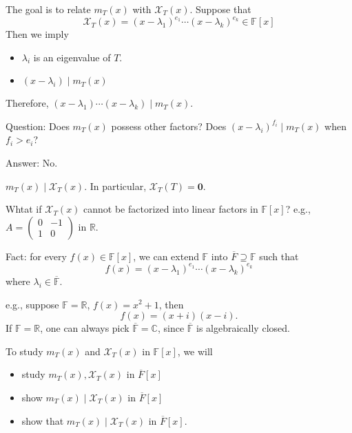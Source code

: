The goal is to relate $m_T(x)$ with $\mathcal{X}_T(x)$.
Suppose that
\[
\mathcal{X}_T(x) = (x-\lambda_1)^{e_1}\cdots(x-\lambda_k)^{e_k}\in\mathbb{F}[x]
\]
Then we imply
\begin{itemize}
\item
$\lambda_i$ is an eigenvalue of $T$.
\item
$(x-\lambda_i)\mid m_T(x)$
\end{itemize}
Therefore, $(x-\lambda_1)\cdots(x-\lambda_k)\mid m_T(x)$.

Question: Does $m_T(x)$ possess other factors?
Does $(x-\lambda_i)^{f_i}\mid m_T(x)$ when $f_i>e_i$?

Answer: No.

\begin{theorem}
$m_T(x)\mid\mathcal{X}_T(x)$. In particular, $\mathcal{X}_T(T)=\bm0$.
\end{theorem}
Whtat if $\mathcal{X}_{T}(x)$ cannot be factorized into linear factors in $\mathbb{F}[x]$? e.g., $A=\begin{pmatrix}
0&-1\\1&0
\end{pmatrix}$ in $\mathbb{R}$.

Fact: for every $f(x)\in\mathbb{F}[x]$, we can extend $\mathbb{F}$ into $\overline{F}\supseteq\mathbb{F}$ such that
\[
f(x) = (x-\lambda_1)^{e_1}\cdots(x-\lambda_k)^{e_k}
\]
where $\lambda_i\in\overline{\mathbb{F}}$.

e.g., suppose $\mathbb{F}=\mathbb{R}$, $f(x) = x^2+1$, then
\[
f(x) = (x+i)(x-i).
\]
If $\mathbb{F}= \mathbb{R}$, one can always pick $\overline{\mathbb{F}}=\mathbb{C}$, since $\overline{\mathbb{F}}$ is algebraically closed.

To study $m_T(x)$ and $\mathcal{X}_T(x)$ in $\mathbb{F}[x]$, we will
\begin{itemize}
\item
study $m_T(x),\mathcal{X}_T(x)$ in $\overline{F}[x]$
\item
show $m_T(x)\mid\mathcal{X}_T(x)$ in $\overline{F}[x]$
\item
show that $m_T(x)\mid\mathcal{X}_T(x)$ in $\overline{F}[x]$.
\end{itemize}

